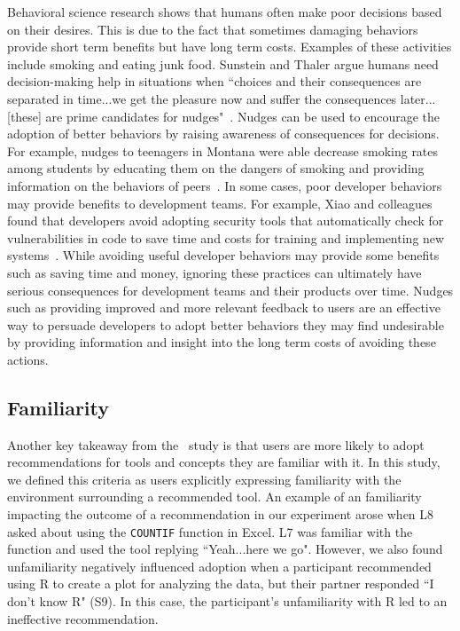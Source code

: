 Behavioral science research shows that humans often make poor decisions based on their desires. This is due to the fact that sometimes damaging behaviors provide short term benefits but have long term costs. Examples of these activities include smoking and eating junk food. Sunstein and Thaler argue humans need decision-making help in situations when ``choices and their consequences are separated in time...we get the pleasure now and suffer the consequences later...[these] are prime candidates for nudges"~\cite[p.~75]{sunstein2008nudge}. Nudges can be used to encourage the adoption of better behaviors by raising awareness of consequences for decisions. For example, nudges to teenagers in Montana were able decrease smoking rates among students by educating them on the dangers of smoking and providing information on the behaviors of peers~\cite{linkenbach2003most}. In some cases, poor developer behaviors may provide benefits to development teams. For example, Xiao and colleagues found that developers avoid adopting security tools that automatically check for vulnerabilities in code to save time and costs for training and implementing new systems~\cite{Xiao2014Security}. While avoiding useful developer behaviors may provide some benefits such as saving time and money, ignoring these practices can ultimately have serious consequences for development teams and their products over time. Nudges such as providing improved and more relevant feedback to users are an effective way to persuade developers to adopt better behaviors they may find undesirable by providing information and insight into the long term costs of avoiding these actions. 

\subsection{Familiarity}

Another key takeaway from the \peer~study is that users are more likely to adopt recommendations for tools and concepts they are familiar with it. In this study, we defined this criteria as users explicitly expressing familiarity with the environment surrounding a recommended tool. An example of an familiarity impacting the outcome of a recommendation in our experiment arose when L8 asked about using the \texttt{COUNTIF} function in Excel. L7 was familiar with the function and used the tool replying ``Yeah...here we go". However, we also found unfamiliarity negatively influenced adoption when a participant recommended using R to create a plot for analyzing the data, but their partner responded ``I don’t know R" (S9). In this case, the participant's unfamiliarity with R led to an ineffective recommendation. 

